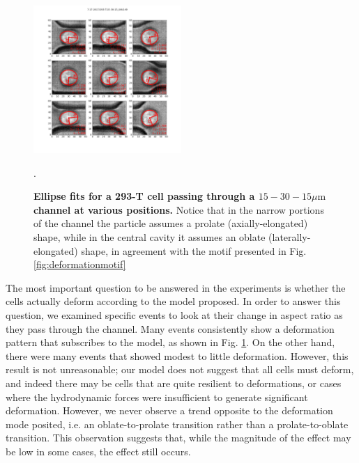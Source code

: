 		\begin{figure}
			\includegraphics[width=0.5\textwidth]{ellipses.png}
			\caption{\textbf{Ellipse fits for a 293-T cell passing through a $15-30-15 \mu\mathrm{m}$ channel at various positions.} Notice that in the narrow portions of the channel the particle assumes a prolate (axially-elongated) shape, while in the central cavity it assumes an oblate (laterally-elongated) shape, in agreement with the motif presented in Fig. \ref{fig:deformationmotif}}.
			\label{fig:ellipses}
		\end{figure}

	
		The most important question to be answered in the experiments is whether the cells actually deform according to the model proposed. In order to answer this question, we examined specific events to look at their change in aspect ratio as they pass through the channel. Many events consistently show a deformation pattern that subscribes to the model, as shown in Fig. \ref{fig:ellipses}. On the other hand, there were many events that showed modest to little deformation. However, this result is not unreasonable; our model does not suggest that all cells must deform, and indeed there may be cells that are quite resilient to deformations, or cases where the hydrodynamic forces were insufficient to generate significant deformation. However, we never observe a trend opposite to the deformation mode posited, i.e. an oblate-to-prolate transition rather than a prolate-to-oblate transition. This observation suggests that, while the magnitude of the effect may be low in some cases, the effect still occurs.

		

		
		


